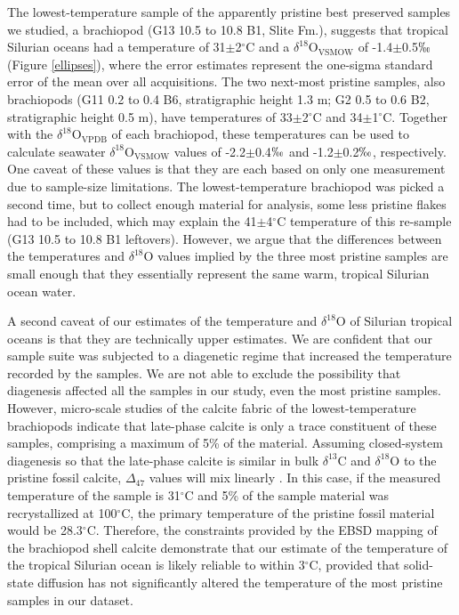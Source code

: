 \documentclass[5p, authoryear]{elsarticle}
\begin{document}
The lowest-temperature sample of the apparently pristine best preserved samples we studied, a brachiopod (G13 10.5 to 10.8 B1, Slite Fm.), suggests that tropical Silurian oceans had a temperature of 31$\pm$2$^{\circ}$C and a $\delta^{18}$O$_{\text{VSMOW}}$ of -1.4$\pm$0.5$\permil$ (Figure \ref{ellipses}), where the error estimates represent the one-sigma standard error of the mean over all acquisitions. The two next-most pristine samples, also brachiopods (G11 0.2 to 0.4 B6, stratigraphic height 1.3 m; G2 0.5 to 0.6 B2, stratigraphic height 0.5 m), have temperatures of 33$\pm$2$^{\circ}$C and 34$\pm$1$^{\circ}$C. Together with the $\delta^{18}$O$_{\text{VPDB}}$ of each brachiopod, these temperatures can be used to calculate seawater $\delta^{18}$O$_{\text{VSMOW}}$ values of -2.2$\pm$0.4$\permil$ and -1.2$\pm$0.2$\permil$, respectively. One caveat of these values is that they are each based on only one measurement due to sample-size limitations. The lowest-temperature brachiopod was picked a second time, but to collect enough material for analysis, some less pristine flakes had to be included, which may explain the 41$\pm$4$^{\circ}$C temperature of this re-sample (G13 10.5 to 10.8 B1 leftovers). However, we argue that the differences between the temperatures and $\delta^{18}$O values implied by the three most pristine samples are small enough that they essentially represent the same warm, tropical Silurian ocean water. 

A second caveat of our estimates of the temperature and $\delta^{18}$O of Silurian tropical oceans is that they are technically upper estimates. We are confident that our sample suite was subjected to a diagenetic regime that increased the temperature recorded by the samples. We are not able to exclude the possibility that diagenesis affected all the samples in our study, even the most pristine samples. However, micro-scale studies of the calcite fabric of the lowest-temperature brachiopods indicate that late-phase calcite is only a trace constituent of these samples, comprising a maximum of 5\% of the material. Assuming closed-system diagenesis so that the late-phase calcite is similar in bulk $\delta^{13}$C and $\delta^{18}$O to the pristine fossil calcite, $\Delta_{47}$ values will mix linearly \citep{Affek2006}. In this case, if the measured temperature of the sample is 31$^{\circ}$C and 5\% of the sample material was recrystallized at 100$^{\circ}$C, the primary temperature of the pristine fossil material would be 28.3$^{\circ}$C. Therefore, the constraints provided by the EBSD mapping of the brachiopod shell calcite demonstrate that our estimate of the temperature of the tropical Silurian ocean is likely reliable to within 3$^{\circ}$C, provided that solid-state diffusion has not significantly altered the temperature of the most pristine samples in our dataset. 
\end{document}
